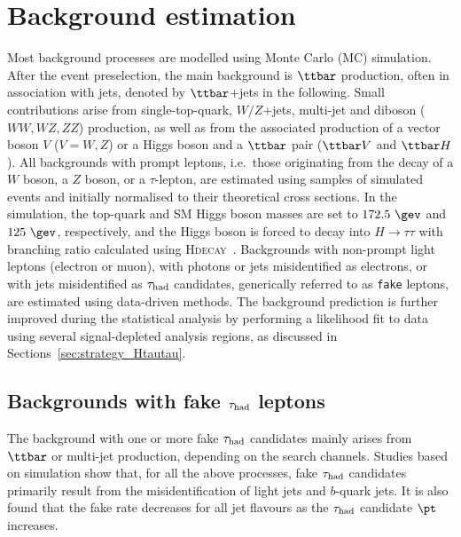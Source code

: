 \section{Background estimation}
\label{sec:background_model}

Most background processes are modelled using Monte Carlo (MC) simulation.
After the event preselection, the main background is $\ttbar$ production, often in association with jets, denoted by $\ttbar$+jets in the following.
Small contributions arise from single-top-quark, $W/Z$+jets, multi-jet and diboson ($WW,WZ,ZZ$) production, as well as from the associated 
production of a vector boson $V$ ($V=W,Z$) or a Higgs boson and a $\ttbar$ pair ($\ttbar V$ and $\ttbar H$). All backgrounds 
with prompt leptons, i.e.\ those originating from the decay of a $W$ boson, a $Z$ boson, or a $\tau$-lepton,
are estimated using samples of simulated events and initially normalised to their theoretical cross sections.
In the simulation, the top-quark and SM Higgs boson masses are set to $172.5~\gev$ and $125~\gev$, respectively,
and the Higgs boson is forced to decay into $H\to \tau\tau$ with branching ratio calculated using \textsc{Hdecay}~\cite{Djouadi:1997yw}.  
Backgrounds with non-prompt light leptons (electron or muon), with photons or jets misidentified as electrons, or with jets misidentified as $\tau_{\mathrm{had}}$ candidates, 
generically referred to as \texttt{fake} leptons, are estimated using data-driven methods. 
The background prediction is further improved during the statistical analysis by performing a likelihood 
fit to data using several signal-depleted analysis regions, as discussed in Sections~\ref{sec:strategy_Htautau}.

\subsection{Backgrounds with fake $\tau_{\mathrm{had}}$ leptons}
\label{sec:faketaus}
The background with one or more fake $\tau_{\mathrm{had}}$ candidates mainly arises from $\ttbar$ or
multi-jet production, depending on the search channels.
Studies based on simulation show that, for all the above processes, fake $\tau_{\mathrm{had}}$ candidates primarily result from the
misidentification of light jets and $b$-quark jets.
It is also found that the fake rate decreases for all jet flavours as the $\tau_{\mathrm{had}}$ candidate $\pt$ increases.

